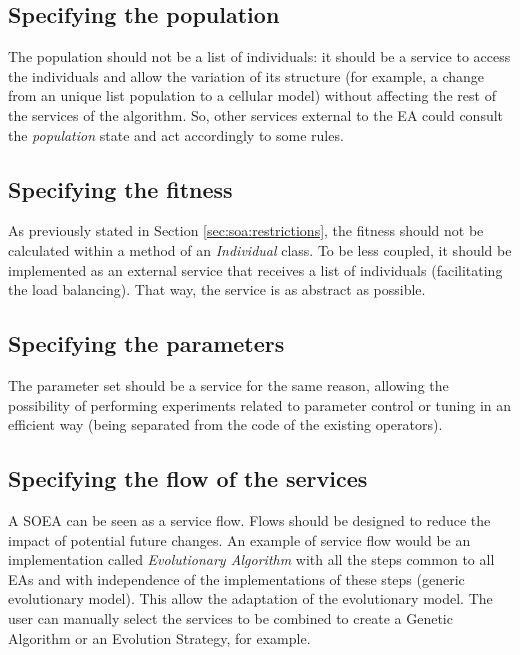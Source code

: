 \subsection{Specifying the population} The population should not be a list of individuals: it should be a service
to access the individuals and allow the variation of its structure (for example, a change
from an unique list population to a cellular model) without
affecting  the rest of the services of the algorithm. So, other services
external to the EA could consult the {\em population} state and act
accordingly to some rules. 

\subsection{Specifying the fitness}
As previously stated in Section \ref{sec:soa:restrictions}, %
 the fitness should not be calculated within a method of an {\em Individual} class. To be less
coupled, it should be implemented as an external service that receives a list of individuals (facilitating the load balancing). That way, the service is as abstract as possible. 

\subsection{Specifying the parameters}
The parameter set should be a service for the same reason, allowing the possibility of performing
experiments related to  parameter control or tuning \cite{ParameterControlEiben07} in an efficient way
(being separated from the code of the existing operators). 

\subsection{Specifying the flow of the services}

A SOEA can be seen as a service flow. Flows should be designed to reduce the impact of potential future changes. An example of service flow would be an implementation called {\em Evolutionary Algorithm} with all the steps common to all EAs and with independence of the implementations of these steps (generic evolutionary model). This allow the adaptation of the evolutionary model. The user can manually
  select the services to be combined to create a Genetic Algorithm or
  an Evolution Strategy, for example.  


